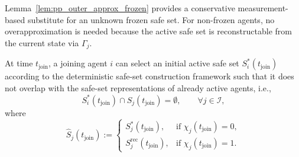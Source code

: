\documentclass[twocolumn]{autart}
\begin{document}
Lemma~\ref{lem:pp_outer_approx_frozen} provides a conservative measurement-based substitute for an unknown frozen safe set. For non-frozen agents, no overapproximation is needed because the active safe set is reconstructable from the current state via \(\Gamma_j\).
\begin{assumption}
\label{ass:pp_join_feasible}
At time $t_{\mathrm{join}}$, a joining agent $i$ can select an initial active safe set
\(
S_i^\ast(t_{\mathrm{join}})
\)
according to the deterministic safe-set construction framework such that it does not overlap with the safe-set representations of already active agents, i.e.,
\begin{equation}
S_i^\ast(t_{\mathrm{join}})\cap \hat S_j(t_{\mathrm{join}})=\emptyset,
\qquad \forall j\in\mathcal I,
\label{eq:pp_join_nonoverlap}
\end{equation}
where
\[
\hat S_j(t_{\mathrm{join}})
:=
\begin{cases}
S_j^\ast(t_{\mathrm{join}}), & \text{if } \chi_j(t_{\mathrm{join}})=0,\\[0.2em]
S_j^{\mathrm{rec}}(t_{\mathrm{join}}), & \text{if } \chi_j(t_{\mathrm{join}})=1.
\end{cases}
\]
\end{assumption}
\end{document}

